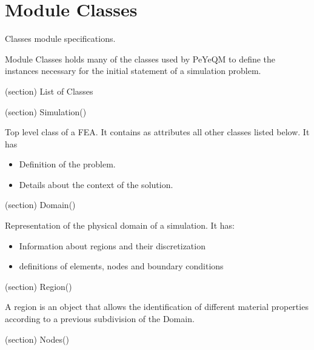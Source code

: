 %
%
%


\section{Module Classes}

    \label{Classes}
Classes module specifications.

Module Classes holds many of the classes used by PeYeQM to define the 
instances necessary for the initial statement of a simulation problem.

(section) List of Classes

  (section) Simulation()

    Top level class of a FEA. It contains as attributes all other classes 
    listed below. It has

    \begin{itemize}
    \setlength{\parskip}{0.6ex}
      \item Definition of the problem.

      \item Details about the context of the solution.

    \end{itemize}

  (section) Domain()

    Representation of the physical domain of a simulation. It has:

    \begin{itemize}
    \setlength{\parskip}{0.6ex}
      \item Information about regions and their discretization

      \item definitions of elements, nodes and boundary conditions

    \end{itemize}

  (section) Region()

    A region is an object that allows the identification of different 
    material properties according to a previous subdivision of the Domain.

  (section) Nodes()

